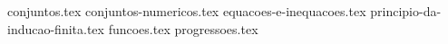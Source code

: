 \documentclass[a4paper,12pt, oneside]{book}
\begin{document}
    \nocite{*}
    \thispagestyle{empty}       %

    \printtitle                 %
        \vfill
    \printauthor                %
    \newpage
    
    \frontmatter %
    \tableofcontents
    \mainmatter %
    
    {
        \newcommand{\templatesdir}{src/esqueletos-dos-capitulos/}

        {conjuntos.tex}
        {conjuntos-numericos.tex}
        {equacoes-e-inequacoes.tex}
        {principio-da-inducao-finita.tex}
        {funcoes.tex}
        {progressoes.tex}
    }
    
    \begin{comment}
    \chapter{Funções}
    {introducao.tex}
    {definicao.tex}
    {compostas.tex}
    {inversa.tex}
    {inj-sobr.tex}
    {formulas-e-funcoes.tex}
    {cardinalidade.tex}
    \end{comment}
\end{document}

